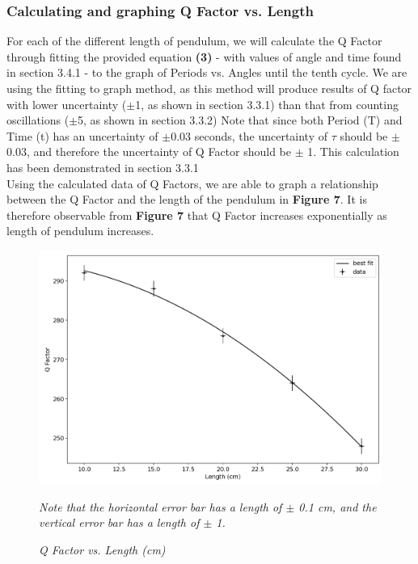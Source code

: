 \documentclass{article}
\begin{document}
\subsubsection{Calculating and graphing Q Factor vs. Length}
For each of the different length of pendulum, we will calculate the Q Factor through fitting the provided equation \textbf{(3)} - with values of angle and time found in section 3.4.1 - to the graph of Periods vs. Angles until the tenth cycle. We are using the fitting to graph method, as this method will produce results of Q factor with lower uncertainty ($\pm$1, as shown in section 3.3.1) than that from counting oscillations ($\pm$5, as shown in section 3.3.2) Note that since both Period (T) and Time (t) has an uncertainty of $\pm$0.03 seconds, the uncertainty of $\tau$ should be $\pm$ 0.03, and therefore the uncertainty of Q Factor should be $\pm$ 1. This calculation has been demonstrated in section 3.3.1 \\
\indent Using the calculated data of Q Factors, we are able to graph a relationship between the Q Factor and the length of the pendulum in \textbf{Figure 7}. It is therefore observable from \textbf{Figure 7} that Q Factor increases exponentially as length of pendulum increases.

\begin{figure}[!htb]
	\includegraphics[scale=0.3]{Q_Factor_Length.png}
	\caption{\textit{Q Factor vs. Length (cm)}}
	\center 
	\textit{Note that the horizontal error bar has a length of $\pm$ 0.1 cm, and the vertical error bar has a length of $\pm$ 1. }
	\label{length}
	
\end{figure}
\end{document}
